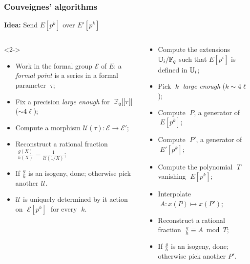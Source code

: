 \documentclass[10pt]{beamer}
\begin{document}
{
\begin{frame}
  \frametitle{Couveignes' algorithms}
  
  \begin{center}
    \textbf{Idea:} Send $E[p^k]$ over $E'[p^k]$
  \end{center}

  \begin{columns}[t]
    \begin{column}{0.5\textwidth}
      \centering\cite{couveignes94}

      \begin{uncoverenv}<2->
        \begin{itemize}
        \item Work in the formal group $\mathcal{E}$ of $E$: a
          \emph{formal point} is a series in a formal parameter
          $\;\tau$;
        \item Fix a precision \emph{large enough} for
          $\;\mathbb{F}_q[[\tau]]$ ($\sim 4\ell$);
        \item Compute a morphism $\mathcal{U}(\tau) : \mathcal{E}
          \to \mathcal{E}'$;
        \item Reconstruct a rational fraction $\;\frac{g(X)}{h(X)} =
          \frac{1}{\mathcal{U}(1/X)}$;
        \item If $\frac{g}{h}$ is an isogeny, done; otherwise pick
          another $\mathcal{U}$.
        \item<3> $\mathcal{U}$ is uniquely determined by it action on
          $\;\mathcal{E}[p^k]\;$ for every $\;k$.
        \end{itemize}
      \end{uncoverenv}
    \end{column}
    \begin{column}{0.5\textwidth}
      \centering\cite{couveignes96}
      
      \begin{itemize}
      \item Compute the extensions $\mathbb{U}_i/\mathbb{F}_q$
        such that $E[p^i]$ is defined in $\mathbb{U}_i$;
      \item Pick $\;k\;$ \emph{large enough} ($k\sim 4\ell$);
      \item Compute $\;P$, a generator of $\;E[p^k]$;
      \item Compute $\;P'$, a generator of $\;E'[p^k]$;
      \item Compute the polynomial $\;T\;$ vanishing $\;E[p^k]$;
      \item Interpolate $\;A : x(P) \mapsto x(P')$;
      \item Reconstruct a rational fraction  $\;\frac{g}{h}\equiv A \bmod T$;
      \item If $\frac{g}{h}$ is an isogeny, done; otherwise pick another $P'$.
      \end{itemize}
    \end{column}
  \end{columns}
\end{frame}
}
\end{document}
